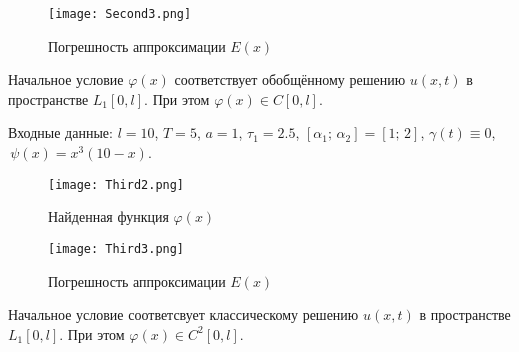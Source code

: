 \documentclass{article}
\theoremstyle{definition}
\begin{document}
\begin{figure}[H]
	\centering
	\texttt{[image: Second3.png]}
	\caption{Погрешность аппроксимации $E(x)$}
	\label{fig:image3}
\end{figure}

Начальное условие $\varphi(x)$ соответствует обобщённому решению $u(x,t)$ в пространстве $L_1[0,l]$. При этом
$\varphi(x) \in C[0,l]$.

\newpage	

Входные данные: 
$l = 10$,  $T = 5$,  $a = 1$, $\tau_1 = 2.5$, $[\alpha_1;\, \alpha_2] = [1;\, 2]$, 
$\gamma(t) \equiv 0$, $\,\psi(x) = x^3(10 - x)$.
\begin{figure}[H]
	\centering
	\texttt{[image: Third2.png]}
	\caption{Найденная функция $\varphi(x)$}
	\label{fig:image6}
\end{figure}

\begin{figure}[H]
	\centering
	\texttt{[image: Third3.png]}
	\caption{Погрешность аппроксимации $E(x)$}
	\label{fig:image5}
\end{figure}

Начальное условие соответсвует классическому решению $u(x,t)$ в пространстве $L_1[0,l]$. При этом
$\varphi(x) \in C^2[0,l]$.

\newpage	

%
%
%
%
%
\end{document}
